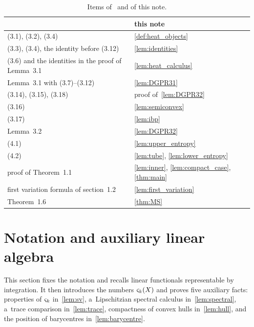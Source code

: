 \documentclass[a4paper,twoside,leqno]{article}
\newcommand{\sv}[1]{\varsigma_{#1}}        %
\begin{document}
\begin{table}[h]
    \centering
    \begin{tabular}{p{}p{}}
        \cite{DePhilippisGennaioliPigatiRindler2026} & this note \\ \hline
        (3.1), (3.2), (3.4) & \ref{def:heat_objects} \\
        (3.3), (3.4), the identity before (3.12) & \ref{lem:identities} \\
        (3.6) and the identities in the proof of Lemma~3.1 & \ref{lem:heat_calculus} \\
        Lemma~3.1 with (3.7)--(3.12) & \ref{lem:DGPR31} \\
        (3.14), (3.15), (3.18) & proof of~\ref{lem:DGPR32} \\
        (3.16) & \ref{lem:semiconvex} \\
        (3.17) & \ref{lem:ibp} \\
        Lemma~3.2 & \ref{lem:DGPR32} \\
        (4.1) & \ref{lem:upper_entropy} \\
        (4.2) & \ref{lem:tube}, \ref{lem:lower_entropy} \\
        proof of Theorem~1.1 & \ref{lem:inner}, \ref{lem:compact_case}, \ref{thm:main} \\
        first variation formula of section~1.2 & \ref{lem:first_variation} \\
        Theorem~1.6 & \ref{thm:MS}
    \end{tabular}
    \caption{Items of~\cite{DePhilippisGennaioliPigatiRindler2026} and of this note.}
    \label{tab:correspondence}
\end{table}

\section{Notation and auxiliary linear algebra}
\label{sec:notation}

\begin{miniremark}
    \label{mr:sec_notation}
    This section fixes the notation and recalls linear functionals representable by integration.
    It then introduces the numbers $\sv{\vdim}(X)$ and proves five auxiliary facts: properties of
    $\sv{\vdim}$ in~\ref{lem:sv}, a~Lipschitzian spectral calculus in~\ref{lem:spectral},
    a~trace comparison in~\ref{lem:trace}, compactness of convex hulls in~\ref{lem:hull}, and the
    position of barycentres in~\ref{lem:barycentre}.
\end{miniremark}
\end{document}
